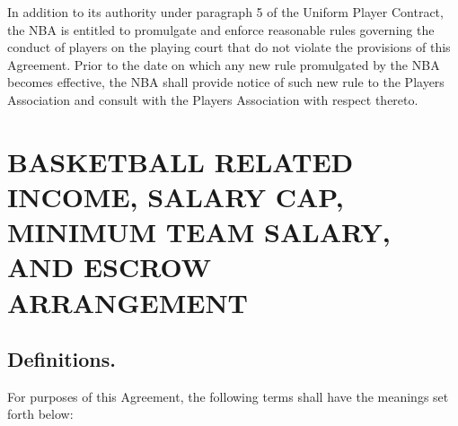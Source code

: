 \documentclass[
]{book}
\begin{document}
In addition to its authority under paragraph 5 of the Uniform Player Contract, the NBA is entitled to promulgate and enforce reasonable rules governing the conduct of players on the playing court that do not violate the provisions of this Agreement. Prior to the date on which any new rule promulgated by the NBA becomes effective, the NBA shall provide notice of such new rule to the Players Association and consult with the Players Association with respect thereto.

\hypertarget{basketball-related-income-salary-cap-minimum-team-salary-and-escrow-arrangement}{%
\chapter{BASKETBALL RELATED INCOME, SALARY CAP, MINIMUM TEAM SALARY, AND ESCROW ARRANGEMENT}\label{basketball-related-income-salary-cap-minimum-team-salary-and-escrow-arrangement}}


\hypertarget{definitions.}{%
\section{Definitions.}\label{definitions.}}

For purposes of this Agreement, the following terms shall have the meanings set forth below:
\end{document}
